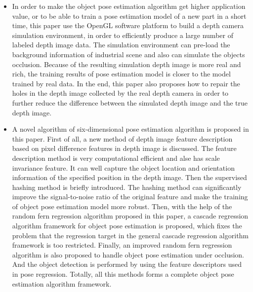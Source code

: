 \begin{englishabstract}
\begin{itemize}
\item In order to make the object pose estimation algorithm get higher application value, or to be able to train a pose estimation model of a new part in a short time, this paper use the OpenGL software platform to build a depth camera simulation environment, in order to efficiently produce a large number of labeled depth image data. The simulation environment can pre-load the background information of industrial scene and also can simulate the objects occlusion. Because of the resulting simulation depth image is more real and rich, the training results of pose estimation model is closer to the model trained by real data. In the end, this paper also proposes how to repair the holes in the depth image collected by the real depth camera in order to further reduce the difference between the simulated depth image and the true depth image.

\item A novel algorithm of six-dimensional pose estimation algorithm is proposed in this paper. First of all, a new method of depth image feature description based on pixel difference features in depth image is discussed. The feature description method is very computational efficient and alse has scale invariance feature. It can well capture the object location and orientation information of the specified position in the depth image. Then the supervised hashing method is briefly introduced. The hashing method can significantly improve the signal-to-noise ratio of the original feature and make the training of object pose estimation model more robust. Then, with the help of the random fern regression algorithm proposed in this paper, a  cascade regression algorithm framework for object pose estimation is proposed, which fixes the problem that the regression target in the general cascade regression algorithm framework is too restricted. Finally, an improved random fern regression algorithm is also proposed to handle object pose estimation under occlusion. And the object detection is performed by using the feature descriptors used in pose regression. Totally, all this methods forms a complete object pose estimation algorithm framework.
\end{itemize}


\end{englishabstract}

